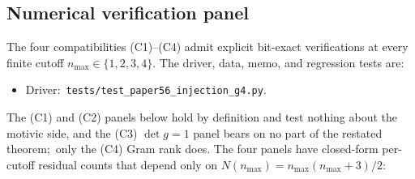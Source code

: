 \documentclass[11pt,a4paper]{article}
\theoremstyle{plain}
\theoremstyle{definition}
\newcommand{\nmax}{n_{\max}}
\begin{document}
\subsection{Numerical verification panel}\label{sec:injection_panel}

The four compatibilities (C1)--(C4) admit explicit bit-exact
verifications at every finite cutoff $\nmax \in \{1, 2, 3, 4\}$. The
driver, data, memo, and regression tests are:
\begin{itemize}
\item Driver:\ \texttt{tests/test\_paper56\_injection\_g4.py}.
\end{itemize}

The (C1) and (C2) panels below hold by definition and test
nothing about the motivic side, and the (C3) $\det g = 1$ panel bears on no
part of the restated theorem;\ only the (C4) Gram rank does. The four
panels have closed-form per-cutoff residual counts that
depend only on $N(\nmax) = \nmax(\nmax + 3)/2$:
\end{document}

